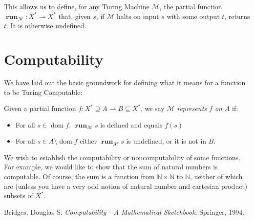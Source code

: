 \documentclass{article}
\newcommand{\N}{\mathbb{N}}
\newcommand{\M}{\mathcal{M}}
\DeclareMathOperator{\run}{\mathbf{run}}
\DeclareMathOperator{\dom}{\mathrm{dom}}
\begin{document}
	This allows us to define, for any Turing Machine $\M$, the partial function $\run_\M : X^* \rightharpoonup X^*$ that, given $s$, if $\M$ halts on input $s$ with some output $t$, returns $t$. It is otherwise undefined.
	
	\section{Computability}
	
	We have laid out the basic groundwork for defining what it means for a function to be Turing Computable:
	
	Given a partial function $f : X^* \supseteq A \rightharpoonup B \subseteq X^*$, we say $\M$ \emph{represents $f$ on $A$} if:
	
	\begin{itemize}
	
	\item For all $s \in \dom f$, $\run_\M s$ is defined and equals $f(s)$
	
	\item For all $s \in A \setminus \dom f$ either $\run_\M s$ is undefined, or it is not in $B$.
	
	\end{itemize}
	
	We wish to establish the computability or noncomputability of some functions. For example, we would like to show that the sum of natural numbers is computable. Of course, the sum is a function from $\N \times \N$ to $\N$, neither of which are (unless you have a very odd notion of natural number and cartesian product) subsets of $X^*$.
	

	
\begin{thebibliography}{9}
Bridges, Douglas S.
\textit{Computability - A Mathematical Sketchbook}. 
Springer, 1994. %
\end{thebibliography}	
\end{document}
